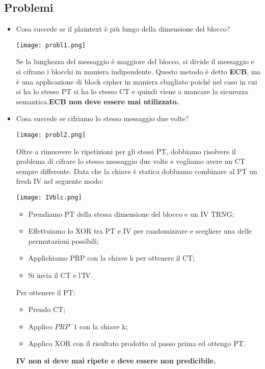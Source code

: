 \documentclass{article}
\theoremstyle{remark}
\begin{document}
\subsection{Problemi}
\begin{itemize}
	\item Cosa succede se il plaintext è più lungo della dimensione del blocco?
	      \begin{center}
		      \texttt{[image: probl1.png]}
	      \end{center}
	      Se la lunghezza del messaggio è maggiore del blocco, si divide il messaggio e si cifrano i blocchi in maniera indipendente. Questo metodo è detto \textbf{ECB}, ma è una applicazione di block cipher in maniera sbagliato poiché nel caso in cui si ha lo stesso PT si ha lo stesso CT e quindi viene a mancare la sicurezza semantica.\newline \textbf{ECB non deve essere mai utilizzato.}
	\item Cosa succede se cifriamo lo stesso messaggio due volte?
	      \begin{center}
		      \texttt{[image: probl2.png]}
	      \end{center}
	      Oltre a rimuovere le ripetizioni per gli stessi PT, dobbiamo risolvere il problema di cifrare lo stesso messaggio due volte e vogliamo avere un CT sempre differente. Data che la chiave è statica dobbiamo combinare al PT un fresh IV nel seguente modo:
	      \begin{center}
		      \texttt{[image: IVblc.png]}
	      \end{center}
	      \begin{itemize}
		      \item Prendiamo PT della stessa dimensione del blocco e un IV TRNG;
		      \item Effettuiamo lo XOR tra PT e IV per randomizzare e scegliere una delle permutazioni possibili;
		      \item Applichiamo PRP con la chiave k per ottenere il CT;
		      \item Si invia il CT e l'IV.
	      \end{itemize}
	      Per ottenere il PT:\begin{itemize}
		      \item Prendo CT;
		      \item Applico $PRP^-1$ con la chiave k;
		      \item Applico XOR con il risultato prodotto al passo prima ed ottengo PT.
	      \end{itemize}
	      \textbf{IV non si deve mai ripete e deve essere non predicibile.}
\end{itemize}
\end{document}

